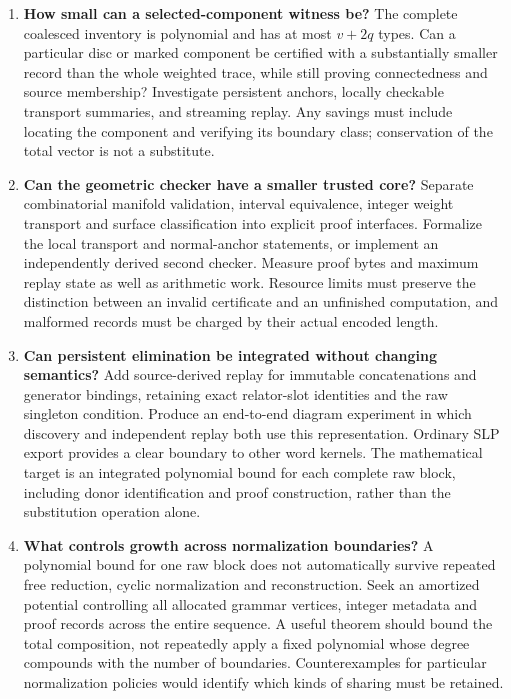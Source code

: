 \begin{enumerate}
\item \textbf{How small can a selected-component witness be?}
The complete coalesced inventory is polynomial and has at most $v+2q$
types. Can a particular disc or marked component be certified with a
substantially smaller record than the whole weighted trace, while still
proving connectedness and source membership? Investigate persistent
anchors, locally checkable transport summaries, and streaming replay.
Any savings must include locating the component and verifying its boundary
class; conservation of the total vector is not a substitute.

\item \textbf{Can the geometric checker have a smaller trusted core?}
Separate combinatorial manifold validation, interval equivalence,
integer weight transport and surface classification into explicit proof
interfaces. Formalize the local transport and normal-anchor statements,
or implement an independently derived second checker. Measure proof
bytes and maximum replay state as well as arithmetic work. Resource
limits must preserve the distinction between an invalid certificate and
an unfinished computation, and malformed records must be charged by
their actual encoded length.

\item \textbf{Can persistent elimination be integrated without changing semantics?}
Add source-derived replay for immutable concatenations and generator
bindings, retaining exact relator-slot identities and the raw singleton
condition. Produce an end-to-end diagram experiment in which discovery
and independent replay both use this representation. Ordinary SLP export
provides a clear boundary to other word kernels. The mathematical target
is an integrated polynomial bound for each complete raw block, including
donor identification and proof construction, rather than the substitution
operation alone.

\item \textbf{What controls growth across normalization boundaries?}
A polynomial bound for one raw block does not automatically survive
repeated free reduction, cyclic normalization and reconstruction.
Seek an amortized potential controlling all allocated grammar vertices,
integer metadata and proof records across the entire sequence. A useful
theorem should bound the total composition, not repeatedly apply a fixed
polynomial whose degree compounds with the number of boundaries.
Counterexamples for particular normalization policies would identify
which kinds of sharing must be retained.


\end{enumerate}
